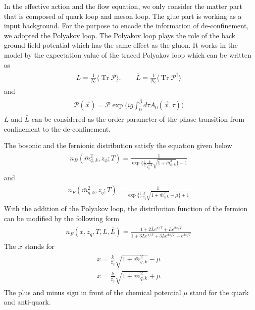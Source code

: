 \documentclass[%
reprint,
superscriptaddress,
showpacs,preprintnumbers,
 amsmath,amssymb,
 aps,
prd,
]{revtex4-1}
\newcommand{\Tr}{\ensuremath{\operatorname{Tr}}}
\begin{document}
In the effective action and the flow equation, we only consider the matter part that is composed of quark loop and meson loop. The 
glue part is working as a input background. For the purpose to encode the information of de-confinement, we adopted the Polyakov 
loop. The Polyakov loop plays the role of the back ground field potential which has the same effect as the gluon. It works in the model 
by the expectation value of the traced Polyakov loop which can be written as
\begin{align}\label{}
\begin{split}
L=\frac{1}{N_c}\langle \Tr{\mathcal{P}} \rangle ,\qquad \bar{L}=\frac{1}{N_c}\langle \Tr{\mathcal{P^{\dagger}}} \rangle
\end{split}
\end{align}
and
\begin{align}\label{}
\begin{split}
\mathcal{P}(\vec{x})=\mathcal{P}\exp\bigg( ig\int_{0}^{\beta}d\tau A_0(\vec{x},\tau) \bigg)
\end{split}
\end{align}
$L$ and $\bar{L}$ can be considered as the order-parameter of the phase transition from confinement to the de-confinement.\par


The bosonic and the fernionic distribution satisfy the equation given below
\begin{align}
\begin{split}
n_B(\bar{m}^{2}_{\phi,k},z_\phi;T)=\frac{1}{\exp\lbrace \frac{1}{T}\frac{k}{z_\phi^{1/2}}\sqrt{1+\bar{m}^{2}_{\phi,k}}
\rbrace-1}
\end{split}
\end{align} 
and
\begin{align}
\begin{split}
n_F(\bar{m}^{2}_{q,k},z_q;T)=\frac{1}{\exp\lbrace \frac{1}{T}\frac{k}{z_q}\sqrt{1+\bar{m}^{2}_{q,k}}-\mu 
\rbrace+1}
\end{split}
\end{align} 
With the addition of the Polyakov loop, the distribution function of the fermion can be modified by the following form
\begin{align}
\begin{split}
n_F(x,z_q,T,L,\bar{L})=\frac{1+2\bar{L}e^{x/T}+Le^{2x/T}}{1+3\bar{L}e^{x/T}+3Le^{2x/T}+e^{3x/T}} 
\end{split}
\end{align} 
The $x$ stands for
\begin{align}
\begin{split}
x=\frac{k}{z_q}\sqrt{1+\bar{m}^{2}_{q,k}}-\mu \\
\bar{x}=\frac{k}{z_q}\sqrt{1+\bar{m}^{2}_{q,k}}+\mu
\end{split}
\end{align} 
The plus and minus sign in front of the chemical potential $\mu$ stand for the quark and anti-quark.
\end{document}

